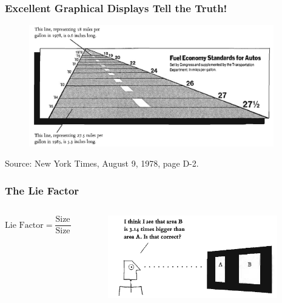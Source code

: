 \documentclass[notes, aspectratio=1610]{beamer}
\begin{document}
\begin{frame}
	\frametitle{Excellent Graphical Displays Tell the Truth!}
	\begin{figure}
		\begin{small}
			\begin{center}
				\includegraphics[width=0.95\textwidth]{
					images/fuel_economy.png}
			\end{center}
		\end{small}
	\end{figure}

\footnotesize
Source: New York Times, August 9, 1978, page D-2.
\end{frame}

\begin{frame}
	\frametitle{The Lie Factor}
	\begin{columns}
		\begin{column}{0.5\textwidth}
			\footnotesize
			\begin{equation}
				\text{Lie Factor} = \frac{\text{Size of the effect shown in graphic}}
					                 {\text{Size of effect in data}}
			\end{equation}
		\end{column}
		\begin{column}{0.5\textwidth}
			\begin{figure}
				\begin{small}
					\begin{center}
						\includegraphics[width=0.95\textwidth]{
							images/is_that_correct.png}
					\end{center}
				\end{small}
			\end{figure}
		\end{column}
	\end{columns}
\end{frame}
\end{document}
